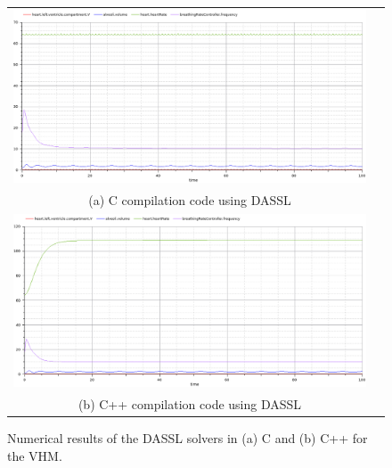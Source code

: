 \documentclass[10pt]{article}
\begin{document}
\begin{figure}[htbp]
\begin{center}
\begin{tabular}{cc}
		\includegraphics[scale=0.45]{DasslC.png}		\\
		\footnotesize(a) {\sf C} compilation code using DASSL	\\
			\includegraphics[scale=0.45]{DasslCpp.png}\\
			\footnotesize(b) {\sf C++} compilation code using DASSL\\
	\end{tabular}
\end{center}
\vspace{-0.5cm}

\caption{Numerical results of the DASSL solvers in (a) {\sf C} and (b) {\sf C++} for the VHM.} \label{Fig:1}
\end{figure}
\end{document}
